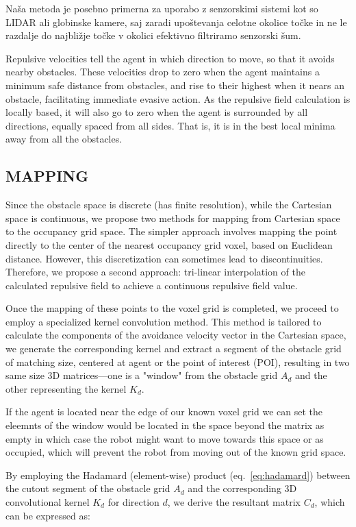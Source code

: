 \documentclass[letterpaper, 10 pt, conference]{ieeeconf}  %
\begin{document}
Naša metoda je posebno primerna za uporabo z senzorskimi sistemi kot so LIDAR ali globinske kamere, saj zaradi upoštevanja celotne okolice točke in ne le razdalje do najbližje točke v okolici efektivno filtriramo senzorski šum.

Repulsive velocities tell the agent in which direction to move, so that it avoids nearby obstacles. These velocities drop to zero when the agent maintains a minimum safe distance from obstacles, and rise to their highest when it nears an obstacle, facilitating immediate evasive action. As the repulsive field calculation is locally based, it will also go to zero when the agent is surrounded by all directions, equally spaced from all sides. That is, it is in the best local minima away from all the obstacles. 

\subsection{MAPPING}

Since the obstacle space is discrete (has finite resolution), while the Cartesian space is continuous, we propose two methods for mapping from Cartesian space to the occupancy grid space. The simpler approach involves mapping the point directly to the center of the nearest occupancy grid voxel, based on Euclidean distance. However, this discretization can sometimes lead to discontinuities. Therefore, we propose a second approach: tri-linear interpolation of the calculated repulsive field to achieve a continuous repulsive field value.

Once the mapping of these points to the voxel grid is completed, we proceed to employ a specialized kernel convolution method. This method is tailored to calculate the components of the avoidance velocity vector in the Cartesian space, we generate the corresponding kernel and extract a segment of the obstacle grid of matching size, centered at agent or the point of interest (POI), resulting in two same size 3D matrices—one is a "window" from the obstacle grid $A_d$ and the other representing the kernel $K_d$.

If the agent is located near the edge of our known voxel grid we can set the eleemnts of the window would be located in the space beyond the matrix as empty in which case the robot might want to move towards this space or as occupied, which will prevent the robot from moving out of the known grid space.

By employing the Hadamard (element-wise) product (eq.~\ref{eq:hadamard}) between the cutout segment of the obstacle grid \(A_d\) and the corresponding 3D convolutional kernel \(K_d\) for direction \(d\), we derive the resultant matrix \(C_d\), which can be expressed as:
\end{document}
